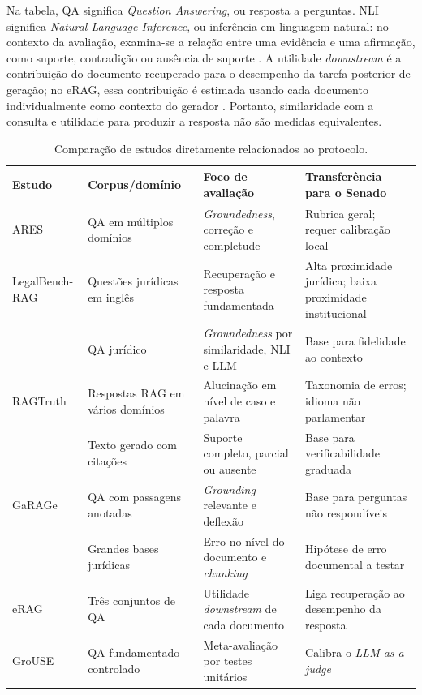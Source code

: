 Na tabela, QA significa \textit{Question Answering}, ou resposta a perguntas. NLI significa \textit{Natural Language Inference}, ou inferência em linguagem natural: no contexto da avaliação, examina-se a relação entre uma evidência e uma afirmação, como suporte, contradição ou ausência de suporte \parencite{trautmannEtAl2024groundedness}. A utilidade \textit{downstream} é a contribuição do documento recuperado para o desempenho da tarefa posterior de geração; no eRAG, essa contribuição é estimada usando cada documento individualmente como contexto do gerador \parencite{salemiZamani2024erag}. Portanto, similaridade com a consulta e utilidade para produzir a resposta não são medidas equivalentes.

\begin{table}[hb!]
\centering
\caption{Comparação de estudos diretamente relacionados ao protocolo.}
\label{tab:trabalhos-relacionados}
\small
\begin{tabular}{p{2.7cm}p{2.8cm}p{3.1cm}p{2.5cm}}
\toprule
Estudo & Corpus/domínio & Foco de avaliação & Transferência para o Senado \\
\midrule
ARES & QA em múltiplos domínios & \textit{Groundedness}, correção e completude & Rubrica geral; requer calibração local \\
LegalBench-RAG & Questões jurídicas em inglês & Recuperação e resposta fundamentada & Alta proximidade jurídica; baixa proximidade institucional \\
\textcite{trautmannEtAl2024groundedness} & QA jurídico & \textit{Groundedness} por similaridade, NLI e LLM & Base para fidelidade ao contexto \\
RAGTruth & Respostas RAG em vários domínios & Alucinação em nível de caso e palavra & Taxonomia de erros; idioma não parlamentar \\
\textcite{zhangEtAl2024fineGrainedCitation} & Texto gerado com citações & Suporte completo, parcial ou ausente & Base para verificabilidade graduada \\
GaRAGe & QA com passagens anotadas & \textit{Grounding} relevante e deflexão & Base para perguntas não respondíveis \\
\textcite{reuterEtAl2025reliableRetrieval} & Grandes bases jurídicas & Erro no nível do documento e \textit{chunking} & Hipótese de erro documental a testar \\
eRAG & Três conjuntos de QA & Utilidade \textit{downstream} de cada documento & Liga recuperação ao desempenho da resposta \\
GroUSE & QA fundamentado controlado & Meta-avaliação por testes unitários & Calibra o \textit{LLM-as-a-judge} \\
\bottomrule
\end{tabular}
\end{table}

